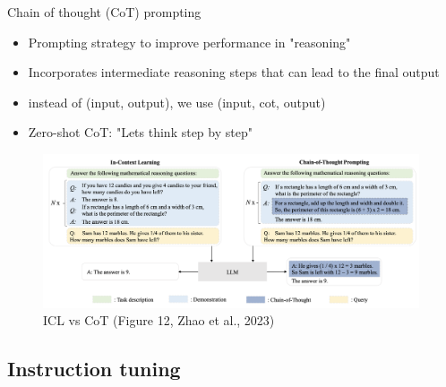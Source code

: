 \documentclass[10pt]{beamer}
\begin{document}
\begin{frame}{Chain of thought (CoT) prompting}


\begin{itemize}
\item Prompting strategy to improve performance in "reasoning"
\item Incorporates intermediate reasoning steps that can lead to the final output
\item instead of (input, output), we use (input, cot, output)
\item Zero-shot CoT: "Lets think step by step"
\end{itemize}

\begin{figure}[h]
\centering
\includegraphics[width=0.99\textwidth]{fig/zhao_2023_fig12}
\caption{ICL vs CoT (Figure 12, Zhao et al., 2023)}
\end{figure}

\end{frame}

\subsection{Instruction tuning}
\end{document}
